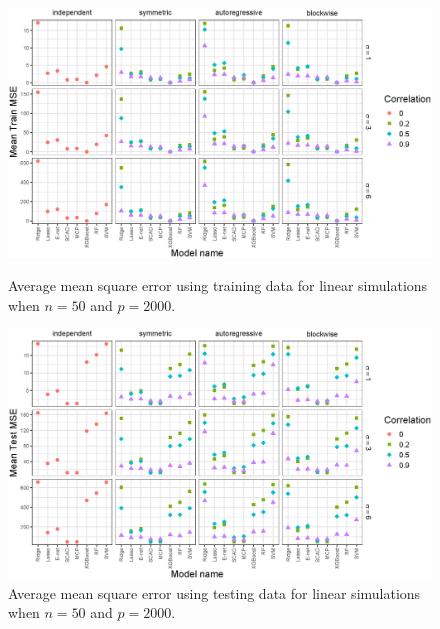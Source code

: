 \documentclass{article}
\begin{document}
	\begin{figure}[h!]
		\centering
		\includegraphics[width = \textwidth]{images/linear-facet/train-mse/facet_train_mse_1_50_2000.eps}
		\captionsetup{width = 0.8\textwidth}
		\caption{Average mean square error using training data for linear simulations when $n = 50$ and $p = 2000$.}
		\label{fig:linear-train-mse-50-2000}
		
		\bigskip
		
		\includegraphics[width = \textwidth]{images/linear-facet/test-mse/facet_test_mse_1_50_2000.eps}
		\captionsetup{width = 0.8\textwidth}
		\caption{Average mean square error using testing data for linear simulations when $n = 50$ and $p = 2000$.}
		\label{fig:linear-test-mse-50-2000}
	\end{figure}
	
\end{document}
